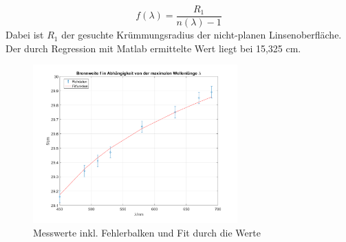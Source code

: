 \documentclass[../protokoll.tex]{subfiles}
\begin{document}
\begin{equation}
    f(\lambda)=\frac{R_1}{n(\lambda)-1}
\end{equation}
Dabei ist $R_1$ der gesuchte Krümmungsradius der nicht-planen Linsenoberfläche. Der durch Regression mit Matlab ermittelte Wert liegt bei 15,325 cm. 
\begin{figure}
    \centering
    \includegraphics[width=0.7\textwidth]{2023-05-08 - V4 - Geometrische Optik, optische Abbildung und Aberrationen/images/versuch1/chrom.png}
    \caption{Messwerte inkl. Fehlerbalken und Fit durch die Werte}
    \label{chrom}
\end{figure}
\end{document}
